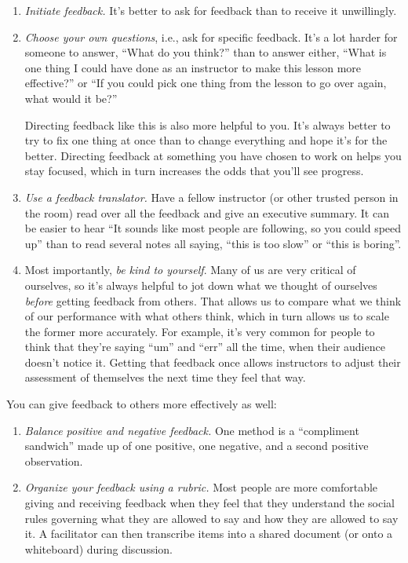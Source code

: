 \documentclass[10pt,statementpaper]{memoir}
\begin{document}
\begin{enumerate}
\def\labelenumi{\arabic{enumi}.}
\item
  \emph{Initiate feedback.} It's better to ask for feedback than to
  receive it unwillingly.
\item
  \emph{Choose your own questions}, i.e., ask for specific feedback.
  It's a lot harder for someone to answer, ``What do you think?'' than
  to answer either, ``What is one thing I could have done as an
  instructor to make this lesson more effective?'' or ``If you could
  pick one thing from the lesson to go over again, what would it be?''

  Directing feedback like this is also more helpful to you. It's always
  better to try to fix one thing at once than to change everything and
  hope it's for the better. Directing feedback at something you have
  chosen to work on helps you stay focused, which in turn increases the
  odds that you'll see progress.
\item
  \emph{Use a feedback translator.} Have a fellow instructor (or other
  trusted person in the room) read over all the feedback and give an
  executive summary. It can be easier to hear ``It sounds like most
  people are following, so you could speed up'' than to read several
  notes all saying, ``this is too slow'' or ``this is boring''.
\item
  Most importantly, \emph{be kind to yourself}. Many of us are very
  critical of ourselves, so it's always helpful to jot down what we
  thought of ourselves \emph{before} getting feedback from others. That
  allows us to compare what we think of our performance with what others
  think, which in turn allows us to scale the former more accurately.
  For example, it's very common for people to think that they're saying
  ``um'' and ``err'' all the time, when their audience doesn't notice
  it. Getting that feedback once allows instructors to adjust their
  assessment of themselves the next time they feel that way.
\end{enumerate}

\newpage

You can give feedback to others more effectively as well:

\begin{enumerate}
\def\labelenumi{\arabic{enumi}.}
\item
  \emph{Balance positive and negative feedback.} One method is a
  ``compliment sandwich'' made up of one positive, one negative, and a
  second positive observation.
\item
  \emph{Organize your feedback using a rubric.} Most people are more
  comfortable giving and receiving feedback when they feel that they
  understand the social rules governing what they are allowed to say and
  how they are allowed to say it. A facilitator can then transcribe
  items into a shared document (or onto a whiteboard) during discussion.
\end{enumerate}
\end{document}
